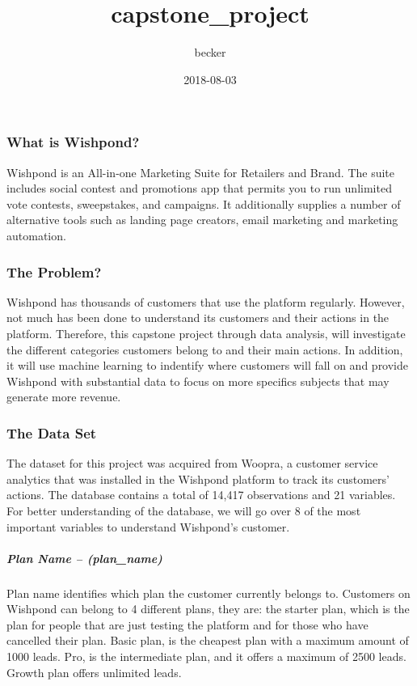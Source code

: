 \documentclass[]{article}
\title{capstone\_project}
\author{becker}
\date{2018-08-03}
\let\oldsubparagraph\subparagraph
\renewcommand{\subparagraph}[1]{\oldsubparagraph{#1}\mbox{}}
\begin{document}
\maketitle

\subsubsection{What is Wishpond?}\label{what-is-wishpond}

Wishpond is an All-in-one Marketing Suite for Retailers and Brand. The
suite includes social contest and promotions app that permits you to run
unlimited vote contests, sweepstakes, and campaigns. It additionally
supplies a number of alternative tools such as landing page creators,
email marketing and marketing automation.

\subsubsection{The Problem?}\label{the-problem}

Wishpond has thousands of customers that use the platform regularly.
However, not much has been done to understand its customers and their
actions in the platform. Therefore, this capstone project through data
analysis, will investigate the different categories customers belong to
and their main actions. In addition, it will use machine learning to
indentify where customers will fall on and provide Wishpond with
substantial data to focus on more specifics subjects that may generate
more revenue.

\subsubsection{The Data Set}\label{the-data-set}

The dataset for this project was acquired from Woopra, a customer
service analytics that was installed in the Wishpond platform to track
its customers' actions. The database contains a total of 14,417
observations and 21 variables. For better understanding of the database,
we will go over 8 of the most important variables to understand
Wishpond's customer.

\subparagraph{Plan Name -- (plan\_name)}\label{plan-name-plan_name}

Plan name identifies which plan the customer currently belongs to.
Customers on Wishpond can belong to 4 different plans, they are: the
starter plan, which is the plan for people that are just testing the
platform and for those who have cancelled their plan. Basic plan, is the
cheapest plan with a maximum amount of 1000 leads. Pro, is the
intermediate plan, and it offers a maximum of 2500 leads. Growth plan
offers unlimited leads.
\end{document}
